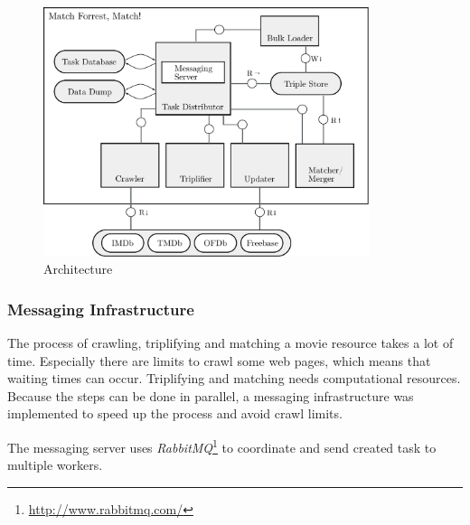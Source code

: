 \begin{figure}[ht]
  \begin{center}
  \includegraphics[width=0.85\textwidth]{images/architecture.pdf}
  \end{center}
  \caption{Architecture}
  \label{fig_architecture}
\end{figure}

\subsubsection{Messaging Infrastructure}
\label{subsubsec_messaging_infrastructure}


The process of crawling, triplifying and matching a movie resource takes a lot of time.
Especially there are limits to crawl some web pages, which means that waiting times can occur. Triplifying and matching needs computational resources.
Because the steps can be done in parallel, a messaging infrastructure was implemented to speed up the process and avoid crawl limits.

The messaging server uses \emph{RabbitMQ}\footnote{\url{http://www.rabbitmq.com/}} to coordinate and send created task to multiple workers.

